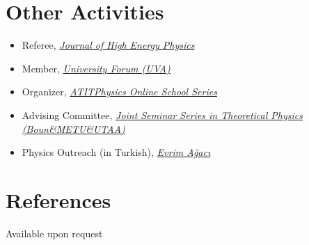 \documentclass[a4paper,11pt]{article}
\begin{document}
\section{\textcolor{burntorange}{Other Activities}}
\begin{itemize}
	\item[] Referee, \emph{\hyperref{https://jhep.sissa.it/}{}{}{Journal of High Energy Physics}}
	\item[] Member, \emph{\hyperref{https://www.uva.nl/en/about-the-uva/policy-and-regulations/policy/university-forum/university-forum.html}{}{}{University Forum (UVA)}}
	\item[] Organizer, \emph{\hyperref{https://www.atitphysics.com}{}{}{ATITPhysics Online School Series}}
	\item[] Advising Committee, \emph{\hyperref{https://sites.google.com/view/boun-metu-utaajointseminerseri/}{}{}{Joint Seminar Series in Theoretical Physics (Boun\&METU\&UTAA)}}
	\item[] Physics Outreach (in Turkish), \emph{\hyperref{https://youtube.com/playlist?list=PL48IwtBKtXrZcWuuJFpcflBkSqJv6YrW9}{}{}{Evrim Ağacı}}
\end{itemize}

\section{\textcolor{burntorange}{References}}
\hspace*{2em}Available upon request

\end{document}
